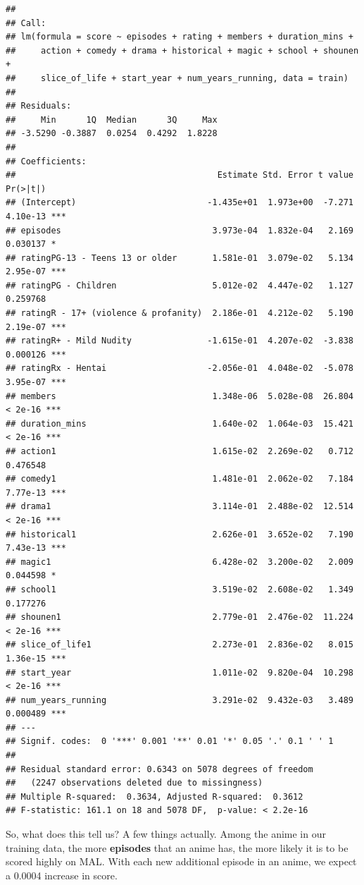 \documentclass[
]{article}
\begin{document}
\begin{verbatim}
## 
## Call:
## lm(formula = score ~ episodes + rating + members + duration_mins + 
##     action + comedy + drama + historical + magic + school + shounen + 
##     slice_of_life + start_year + num_years_running, data = train)
## 
## Residuals:
##     Min      1Q  Median      3Q     Max 
## -3.5290 -0.3887  0.0254  0.4292  1.8228 
## 
## Coefficients:
##                                        Estimate Std. Error t value Pr(>|t|)    
## (Intercept)                          -1.435e+01  1.973e+00  -7.271 4.10e-13 ***
## episodes                              3.973e-04  1.832e-04   2.169 0.030137 *  
## ratingPG-13 - Teens 13 or older       1.581e-01  3.079e-02   5.134 2.95e-07 ***
## ratingPG - Children                   5.012e-02  4.447e-02   1.127 0.259768    
## ratingR - 17+ (violence & profanity)  2.186e-01  4.212e-02   5.190 2.19e-07 ***
## ratingR+ - Mild Nudity               -1.615e-01  4.207e-02  -3.838 0.000126 ***
## ratingRx - Hentai                    -2.056e-01  4.048e-02  -5.078 3.95e-07 ***
## members                               1.348e-06  5.028e-08  26.804  < 2e-16 ***
## duration_mins                         1.640e-02  1.064e-03  15.421  < 2e-16 ***
## action1                               1.615e-02  2.269e-02   0.712 0.476548    
## comedy1                               1.481e-01  2.062e-02   7.184 7.77e-13 ***
## drama1                                3.114e-01  2.488e-02  12.514  < 2e-16 ***
## historical1                           2.626e-01  3.652e-02   7.190 7.43e-13 ***
## magic1                                6.428e-02  3.200e-02   2.009 0.044598 *  
## school1                               3.519e-02  2.608e-02   1.349 0.177276    
## shounen1                              2.779e-01  2.476e-02  11.224  < 2e-16 ***
## slice_of_life1                        2.273e-01  2.836e-02   8.015 1.36e-15 ***
## start_year                            1.011e-02  9.820e-04  10.298  < 2e-16 ***
## num_years_running                     3.291e-02  9.432e-03   3.489 0.000489 ***
## ---
## Signif. codes:  0 '***' 0.001 '**' 0.01 '*' 0.05 '.' 0.1 ' ' 1
## 
## Residual standard error: 0.6343 on 5078 degrees of freedom
##   (2247 observations deleted due to missingness)
## Multiple R-squared:  0.3634, Adjusted R-squared:  0.3612 
## F-statistic: 161.1 on 18 and 5078 DF,  p-value: < 2.2e-16
\end{verbatim}

So, what does this tell us? A few things actually. Among the anime in
our training data, the more \textbf{episodes} that an anime has, the
more likely it is to be scored highly on MAL. With each new additional
episode in an anime, we expect a 0.0004 increase in score.
\end{document}
